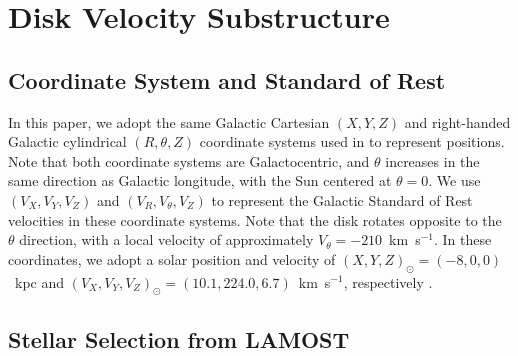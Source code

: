 \documentclass[11pt,preprint]{aastex6}
\begin{document}
\section{Disk Velocity Substructure}
\subsection{Coordinate System and Standard of Rest} \label{sec:coords}

In this paper, we adopt the same Galactic Cartesian $(X,Y,Z)$ and right-handed Galactic cylindrical $(R,\theta,Z)$ coordinate systems used in \citet{Carlin2013} to represent positions. 
Note that both coordinate systems are Galactocentric, and $\theta$ increases in the same direction as Galactic longitude, with the Sun centered at $\theta = 0$.
We use $(V_X,V_Y,V_Z)$ and $(V_R,V_\theta,V_Z)$ to represent the Galactic Standard of Rest velocities in these coordinate systems.
Note that the disk rotates opposite to the $\theta$ direction, with a local velocity of approximately $V_{\theta} = -210$~km~s$^{-1}$.
In these coordinates, we adopt a solar position and velocity of $(X,Y,Z)_{\odot} = (-8,0,0)$~kpc and $(V_X,V_Y,V_Z)_{\odot} = (10.1, 224.0, 6.7)$~km~s$^{-1}$, respectively \citep{Hogg2005}.

\subsection{Stellar Selection from LAMOST} \label{sec:lamost}

\end{document}
